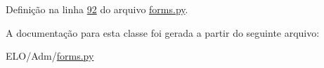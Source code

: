 Definição na linha \hyperlink{Adm_2forms_8py_source_l00092}{92} do arquivo \hyperlink{Adm_2forms_8py_source}{forms.\+py}.



A documentação para esta classe foi gerada a partir do seguinte arquivo\+:\begin{DoxyCompactItemize}
\item 
E\+L\+O/\+Adm/\hyperlink{Adm_2forms_8py}{forms.\+py}\end{DoxyCompactItemize}
